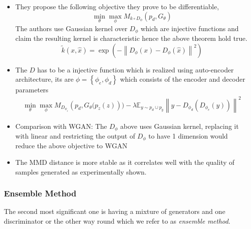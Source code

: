 \begin{itemize}
    
\item They propose the following objective they prove to be differentiable,
$$
\min _{\theta} \max _{\phi} M_{k \circ D_{\phi}}\left(p_d, G_{\theta}\right)
$$
The authors use Gaussian kernel over $D_{\phi}$ which are injective functions and claim the resulting kernel is characteristic hence the above theorem hold true.
$$
\tilde{k}\left(x, \hat{x}\right)=\exp \left(-\left\|D_{\phi}(x)-D_{\phi}(\hat{x})\right\|^{2}\right)
$$
\item The $D$ has to be a injective function which is realized using auto-encoder architecture, its are $
\phi=\left\{\phi_{e}, \phi_{d}\right\}
$ which consists of the encoder and decoder parameters 
\begin{equation}
    \begin{aligned}
    \min _{\theta} \max _{\phi} M_{D_{\phi_e}}  \left(p_d, G_{\theta}(p_z(z)\right))
    -\lambda \mathbb{E}_{y \sim p_d \cup p_g}\left\|y-D_{\phi_{d}}\left(D_{\phi_{e}}(y)\right)\right\|^{2}
    \end{aligned}
\end{equation}

\item Comparison with WGAN: The $D_{\phi}$ above uses Gaussian kernel, replacing it with linear and restricting the output of $D_{\phi}$ to have 1 dimension would reduce the above objective to WGAN
\item The MMD distance is more stable as it correlates well with the quality of samples generated as experimentally shown.
\end{itemize}


\subsubsection{Ensemble Method} \label{subsubsec:arch_em} The second most significant one is having a mixture of generators and one discriminator or the other way round which we refer to as \emph{ensemble method}. 
